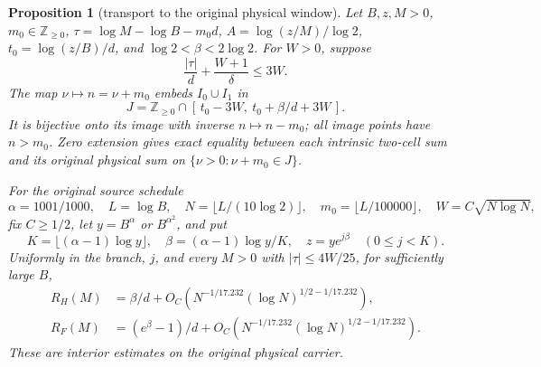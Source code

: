 \documentclass[11pt]{article}
\newtheorem{proposition}{Proposition}
\theoremstyle{remark}\newtheorem{remark}[proposition]{Remark}
\begin{document}
\begin{proposition}[transport to the original physical window]
\label{prop:mazur-physical-centers}
Let $B,z,M>0$, $m_0\in\mathbb Z_{\ge0}$,
$\tau=\log M-\log B-m_0d$, $A=\log(z/M)/\log2$,
$t_0=\log(z/B)/d$, and $\log2<\beta<2\log2$.
For $W>0$, suppose
\begin{equation}
 \frac{|\tau|}{d}+\frac{W+1}{\delta}\le3W.
 \label{eq:mazur-directional-margin}
\end{equation}
The map $\nu\mapsto n=\nu+m_0$ embeds $I_0\cup I_1$ in
\[
 J=\mathbb Z_{\ge0}\cap
       [\,t_0-3W,\ t_0+\beta/d+3W\,].
\]
It is bijective onto its image with inverse $n\mapsto n-m_0$;
all image points have $n>m_0$. Zero extension gives exact equality
between each intrinsic two-cell sum and its original physical sum
on $\{\nu>0:\nu+m_0\in J\}$.

For the original source schedule
\[
 \alpha=1001/1000,\quad L=\log B,\quad
 N=\lfloor L/(10\log2)\rfloor,\quad m_0=\lfloor L/100000\rfloor,
 \quad W=C\sqrt{N\log N},
\]
fix $C\ge1/2$, let $y=B^\alpha$ or $B^{\alpha^2}$, and put
\[
 K=\lfloor(\alpha-1)\log y\rfloor,\quad
 \beta=(\alpha-1)\log y/K,\quad z=y e^{j\beta}\quad(0\le j<K).
\]
Uniformly in the branch, $j$, and every $M>0$ with
$|\tau|\le4W/25$, for sufficiently large $B$,
\begin{align}
 R_H(M)&=\beta/d+
 O_C\!\left(N^{-1/17.232}(\log N)^{1/2-1/17.232}\right),\\
 R_F(M)&=(e^\beta-1)/d+
 O_C\!\left(N^{-1/17.232}(\log N)^{1/2-1/17.232}\right).
 \label{eq:mazur-physical-centers}
\end{align}
These are interior estimates on the original physical carrier.
\end{proposition}
\end{document}
